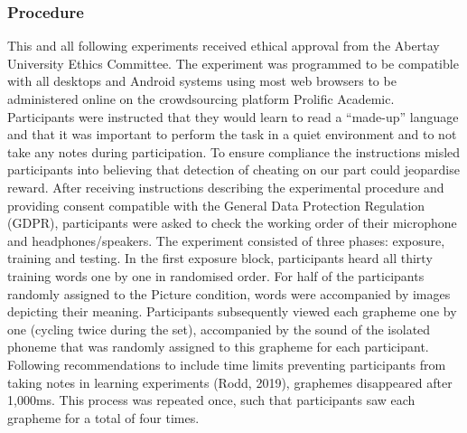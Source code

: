\documentclass[doc,floatsintext]{apa6}
\begin{document}
\subsubsection{Procedure}\label{procedure}

This and all following experiments received ethical approval from the
Abertay University Ethics Committee. The experiment was programmed to be
compatible with all desktops and Android systems using most web browsers
to be administered online on the crowdsourcing platform Prolific
Academic. Participants were instructed that they would learn to read a
\enquote{made-up} language and that it was important to perform the task
in a quiet environment and to not take any notes during participation.
To ensure compliance the instructions misled participants into believing
that detection of cheating on our part could jeopardise reward. After
receiving instructions describing the experimental procedure and
providing consent compatible with the General Data Protection Regulation
(GDPR), participants were asked to check the working order of their
microphone and headphones/speakers. The experiment consisted of three
phases: exposure, training and testing. In the first exposure block,
participants heard all thirty training words one by one in randomised
order. For half of the participants randomly assigned to the Picture
condition, words were accompanied by images depicting their meaning.
Participants subsequently viewed each grapheme one by one (cycling twice
during the set), accompanied by the sound of the isolated phoneme that
was randomly assigned to this grapheme for each participant. Following
recommendations to include time limits preventing participants from
taking notes in learning experiments (Rodd, 2019), graphemes disappeared
after 1,000ms. This process was repeated once, such that participants
saw each grapheme for a total of four times.
\end{document}
